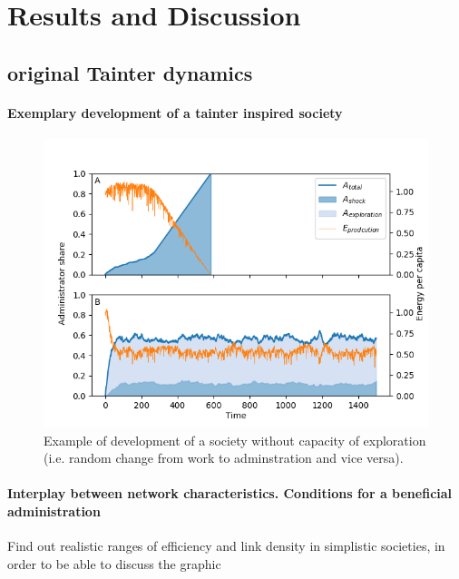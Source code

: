 \section{Results and Discussion}

\subsection{original Tainter dynamics}

\paragraph{Exemplary development of a tainter inspired society}

\begin{figure}[htb]
    \centering
    \includegraphics[width=\linewidth]{../figures/Admin_Ecap_twocases.png}
    \caption{Example of development of a society without capacity of exploration (i.e. random change from work to adminstration and vice versa). }
    \label{fig:baseNetworkDev}
\end{figure}


\paragraph{Interplay between network characteristics. Conditions for a beneficial administration}

Find out realistic ranges of efficiency and link density in simplistic societies, in order to be able to discuss the graphic




